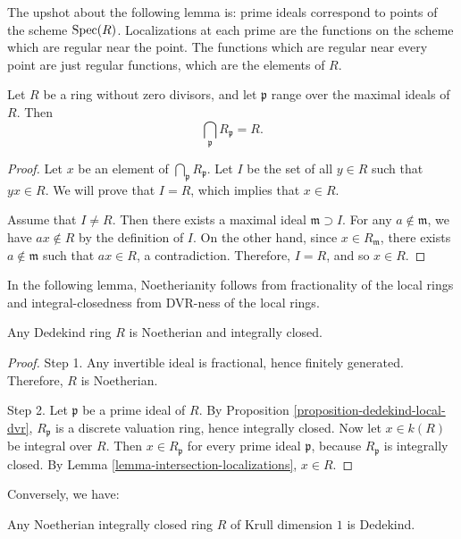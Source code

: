\noindent
The upshot about the following lemma is:
prime ideals correspond to points
of the scheme $\mathop{\mathrm{Spec}}(R)$.
Localizations at each prime are
the functions on the scheme which
are regular near the point.
The functions which are regular
near every point are just regular functions,
which are the elements of $R$.

\begin{lemma}
\label{lemma-intersection-localizations}
Let $R$ be a ring without zero divisors,
and let $\mathfrak{p}$ range over the
maximal ideals of $R$.
Then
$$
\bigcap_{\mathfrak{p}} R_{\mathfrak{p}} = R.
$$
\end{lemma}

\begin{proof}
Let $x$ be an element of
$\bigcap_{\mathfrak{p}} R_{\mathfrak{p}}$.
Let $I$ be the set of all $y\in R$ such
that $yx\in R$.
We will prove that $I=R$, which implies
that $x\in R$.

Assume that $I\neq R$.
Then there exists a maximal ideal
$\mathfrak{m}\supset I$.
For any $a\notin\mathfrak{m}$, we have
$ax\notin R$ by the definition of $I$.
On the other hand, since
$x\in R_{\mathfrak{m}}$, there exists
$a\notin\mathfrak{m}$ such that
$ax\in R$, a contradiction.
Therefore, $I=R$, and so $x\in R$.
\end{proof}

\noindent
In the following lemma,
Noetherianity follows from fractionality
of the local rings
and integral-closedness from
DVR-ness
of the local rings.

\begin{lemma}
\label{lemma-dedekind-noetherian-integrally-closed}
Any Dedekind ring $R$ is Noetherian and
integrally closed.
\end{lemma}

\begin{proof}
Step 1. Any invertible ideal is fractional,
hence finitely generated.
Therefore, $R$ is Noetherian.

Step 2. Let $\mathfrak{p}$ be a prime ideal
of $R$.
By Proposition
\ref{proposition-dedekind-local-dvr},
$R_{\mathfrak{p}}$ is a discrete valuation
ring, hence integrally closed.
Now let $x\in k(R)$ be integral over $R$.
Then $x\in R_{\mathfrak{p}}$ for every
prime ideal $\mathfrak{p}$, because
$R_{\mathfrak{p}}$ is integrally closed.
By Lemma
\ref{lemma-intersection-localizations},
$x\in R$.
\end{proof}

\noindent
Conversely, we have:

\begin{theorem}
\label{theorem-noetherian-integrally-closed-dim1-dedekind}
Any Noetherian integrally closed ring
$R$ of Krull dimension $1$ is
Dedekind.
\end{theorem}

